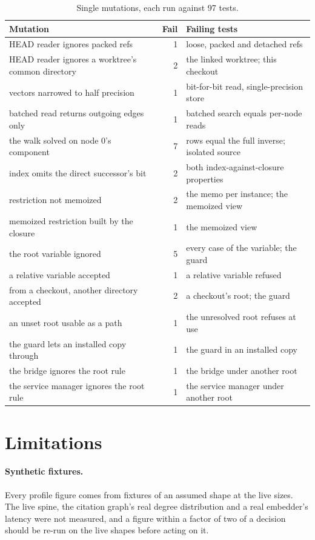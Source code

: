 \documentclass[11pt]{article}
\theoremstyle{plain}
\theoremstyle{definition}
\theoremstyle{remark}
\begin{document}
\begin{table}[ht]
\centering\small
\caption{Single mutations, each run against 97 tests.}
\label{tab:mutations}
\begin{tabular}{@{}lrl@{}}
\toprule
Mutation & Fail & Failing tests \\
\midrule
HEAD reader ignores packed refs & 1 & loose, packed and detached refs \\
HEAD reader ignores a worktree's common directory & 2 & the linked worktree; this checkout \\
vectors narrowed to half precision & 1 & bit-for-bit read, single-precision store \\
batched read returns outgoing edges only & 1 & batched search equals per-node reads \\
the walk solved on node 0's component & 7 & rows equal the full inverse; isolated source \\
index omits the direct successor's bit & 2 & both index-against-closure properties \\
restriction not memoized & 2 & the memo per instance; the memoized view \\
memoized restriction built by the closure & 1 & the memoized view \\
the root variable ignored & 5 & every case of the variable; the guard \\
a relative variable accepted & 1 & a relative variable refused \\
from a checkout, another directory accepted & 2 & a checkout's root; the guard \\
an unset root usable as a path & 1 & the unresolved root refuses at use \\
the guard lets an installed copy through & 1 & the guard in an installed copy \\
the bridge ignores the root rule & 1 & the bridge under another root \\
the service manager ignores the root rule & 1 & the service manager under another root \\
\bottomrule
\end{tabular}
\end{table}

\section{Limitations}\label{sec:limits}

\paragraph{Synthetic fixtures.} Every profile figure comes from fixtures of an assumed shape at the
live sizes. The live spine, the citation graph's real degree distribution and a real embedder's
latency were not measured, and a figure within a factor of two of a decision should be re-run on the
live shapes before acting on it.
\end{document}
